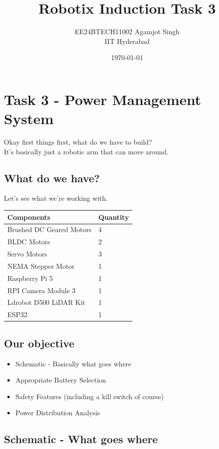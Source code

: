 \documentclass[12pt]{article}
\title{Robotix Induction Task 3}
\author{EE24BTECH11002 Agamjot Singh\\IIT Hyderabad}
\date{\today}
\begin{document}
\maketitle

\section*{Task 3 - Power Management System}
Okay first things first, what do we have to build?\\
It's basically just a robotic arm that can move around.

\subsection*{What do we have?}
Let's see what we're working with.

\begin{table}[h]
\centering
\begin{tabular}{ll}
\toprule
\textbf{Components} & \textbf{Quantity} \\
\midrule
Brushed DC Geared Motors & 4 \\
BLDC Motors & 2 \\
Servo Motors & 3 \\
NEMA Stepper Motor & 1 \\
Raspberry Pi 5 & 1 \\
RPI Camera Module 3 & 1 \\
Ldrobot D500 LiDAR Kit & 1 \\
ESP32 & 1 \\
\bottomrule
\end{tabular}
\end{table}

\subsection*{Our objective}
\begin{itemize}
\item Schematic - Basically what goes where
\item Appropriate Battery Selection
\item Safety Features (including a kill switch of course)
\item Power Distribution Analysis 
\end{itemize}

\newpage

\subsection*{Schematic - What goes where}
\end{document}

